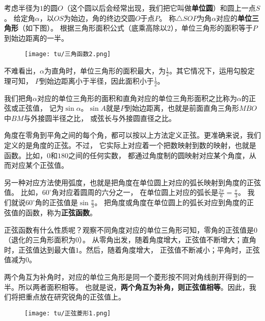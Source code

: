 \documentclass[12pt,UTF8]{ctexbook}
\begin{document}
考虑半径为$1$的圆$O$（这个圆以后会经常出现，我们把它叫做\textbf{单位圆}）和圆上一点$S$。
给定角$\alpha$，以$OS$为始边，角的终边交圆$O$于点$P$。
称$\triangle SOP$为角$\alpha$对应的\textbf{单位三角形}（如下图）。
根据三角形面积公式（底乘高除以$2$），单位三角形的面积等于$P$到始边距离的一半。

\begin{figure}[H] %
    \vspace{4pt}
    \centering
    \texttt{[image: tu/三角函数2.png]}
\end{figure}

不难看出，$\alpha$为直角时，单位三角形的面积最大，为$\frac{1}{2}$。其它情况下，运用勾股定理可知，
$P$到始边距离小于半径，因此面积小于$\frac{1}{2}$。

我们把角$\alpha$对应的单位三角形的面积和直角对应的单位三角形面积之比称为$\alpha$的正弦或正弦值，
记为$\sin \alpha$。$\sin A$就是$P$到始边距离，也就是前面直角三角形$MBO$中$BM$与外接圆半径之比，
或弦长与外接圆直径之比。

角度在零角到平角之间的每个角，都可以按以上方法定义正弦。更准确来说，我们定义的是角度的正弦。不过，
它实际上对应着一个把数映射到数的映射，也就是函数。比如，$0$和$180$之间的任何实数，
都通过角度制的圆映射对应某个角度，从而对应某个正弦值。

另一种对应方法使用弧度，也就是把角度在单位圆上对应的弧长映射到角度的正弦值。
比如，$60^\circ$角对应着圆周的六分之一，
在单位圆上对应的弧长是$\frac{2\pi}{6} = \frac{\pi}{3}$。
我们就说$60^\circ$角的正弦值是$\sin \frac{\pi}{3}$。
把角度或角度在单位圆上的弧长对应到角度的正弦值的函数，称为\textbf{正弦函数}。

正弦函数有什么性质呢？观察不同角度对应的单位三角形可知，零角的正弦值是$0$（退化的三角形面积为$0$）。
从零角出发，随着角度增大，正弦值不断增大；直角时，正弦值达到最大值$1$。然后，随着角度增大，
正弦值不断减小；平角时，正弦值减为$0$。

两个角互为补角时，对应的单位三角形是同一个菱形按不同对角线剖开得到的一半。所以两者面积相等。
也就是说，\textbf{两个角互为补角，则正弦值相等}。因此，我们将把重点放在研究锐角的正弦值上。

\begin{figure}[H] %
    \vspace{4pt}
    \centering
    \texttt{[image: tu/正弦菱形1.png]}
\end{figure}
\end{document}
